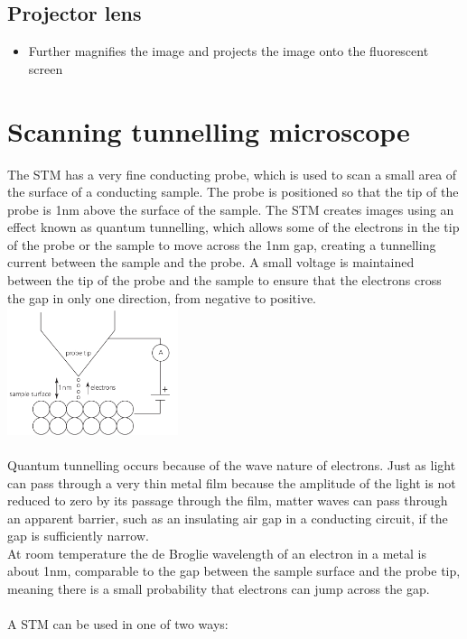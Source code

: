\documentclass[12pt]{article}
\begin{document}
\subsection{Projector lens}
\begin{itemize}
\item Further magnifies the image and projects the image onto the fluorescent screen
\end{itemize}



\newpage
\section{Scanning tunnelling microscope}
The STM has a very fine conducting probe, which is used to scan a small area of the surface of a conducting sample. The probe is positioned so that the tip of the probe is 1nm above the surface of the sample. The STM creates images using an effect known as quantum tunnelling, which allows some of the electrons in the tip of the probe or the sample to move across the 1nm gap, creating a tunnelling current between the sample and the probe. A small voltage is maintained between the tip of the probe and the sample to ensure that the electrons cross the gap in only one direction, from negative to positive.\\
\includegraphics[width=5cm]{stm.png}\\
\\
Quantum tunnelling occurs because of the wave nature of electrons. Just as light can pass through a very thin metal film because the amplitude of the light is not reduced to zero by its passage through the film, matter waves can pass through an apparent barrier, such as an insulating air gap in a conducting circuit, if the gap is sufficiently narrow.\\
At room temperature the de Broglie wavelength of an electron in a metal is about 1nm, comparable to the gap between the sample surface and the probe tip, meaning there is a small probability that electrons can jump across the gap.\\
\\
A STM can be used in one of two ways:
\end{document}
